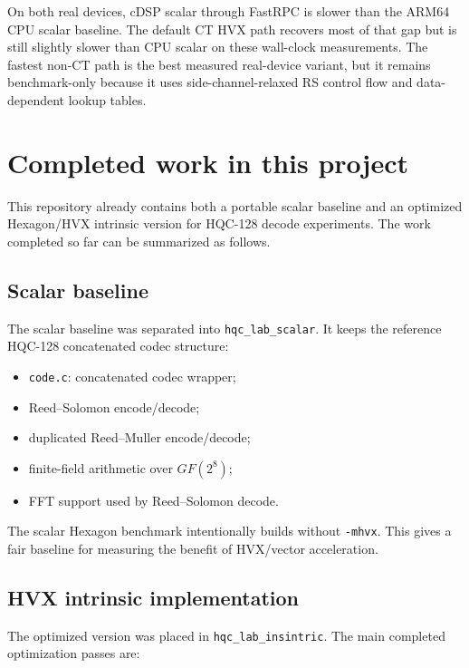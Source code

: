 \documentclass[12pt,a4paper]{article}
\begin{document}
On both real devices, cDSP scalar through FastRPC is slower than the ARM64 CPU scalar baseline. The default CT HVX path recovers most of that gap but is still slightly slower than CPU scalar on these wall-clock measurements. The fastest non-CT path is the best measured real-device variant, but it remains benchmark-only because it uses side-channel-relaxed RS control flow and data-dependent lookup tables.

\section{Completed work in this project}

This repository already contains both a portable scalar baseline and an optimized Hexagon/HVX intrinsic version for HQC-128 decode experiments. The work completed so far can be summarized as follows.

\subsection{Scalar baseline}

The scalar baseline was separated into \texttt{hqc\_lab\_scalar}. It keeps the reference HQC-128 concatenated codec structure:

\begin{itemize}
    \item \texttt{code.c}: concatenated codec wrapper;
    \item Reed--Solomon encode/decode;
    \item duplicated Reed--Muller encode/decode;
    \item finite-field arithmetic over $GF(2^8)$;
    \item FFT support used by Reed--Solomon decode.
\end{itemize}

The scalar Hexagon benchmark intentionally builds without \texttt{-mhvx}. This gives a fair baseline for measuring the benefit of HVX/vector acceleration.

\subsection{HVX intrinsic implementation}

The optimized version was placed in \texttt{hqc\_lab\_insintric}. The main completed optimization passes are:
\end{document}
